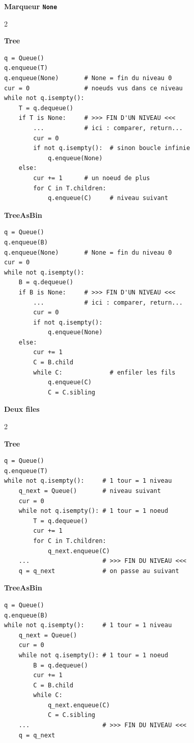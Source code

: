 \documentclass[10pt,a4paper]{article}
\newcommand{\code}[1]{\texttt{#1}}
\newcommand{\TREE}{\colorbox{treec}{\color{white}\strut\small\bfseries\ttfamily Tree}}
\newcommand{\TAB}{\colorbox{tabc}{\color{white}\strut\small\bfseries\ttfamily TreeAsBin}}
\begin{document}
\textbf{\large Marqueur \code{None}}
\begin{multicols}{2}
\TREE
\begin{lstlisting}[style=tree]
q = Queue()
q.enqueue(T)
q.enqueue(None)       # None = fin du niveau 0
cur = 0               # noeuds vus dans ce niveau
while not q.isempty():
    T = q.dequeue()
    if T is None:     # >>> FIN D'UN NIVEAU <<<
        ...           # ici : comparer, return...
        cur = 0
        if not q.isempty():  # sinon boucle infinie
            q.enqueue(None)
    else:
        cur += 1      # un noeud de plus
        for C in T.children:
            q.enqueue(C)     # niveau suivant
\end{lstlisting}
\columnbreak
\TAB
\begin{lstlisting}[style=tab]
q = Queue()
q.enqueue(B)
q.enqueue(None)       # None = fin du niveau 0
cur = 0
while not q.isempty():
    B = q.dequeue()
    if B is None:     # >>> FIN D'UN NIVEAU <<<
        ...           # ici : comparer, return...
        cur = 0
        if not q.isempty():
            q.enqueue(None)
    else:
        cur += 1
        C = B.child
        while C:             # enfiler les fils
            q.enqueue(C)
            C = C.sibling
\end{lstlisting}
\end{multicols}

\textbf{\large Deux files}
\begin{multicols}{2}
\TREE
\begin{lstlisting}[style=tree]
q = Queue()
q.enqueue(T)
while not q.isempty():     # 1 tour = 1 niveau
    q_next = Queue()       # niveau suivant
    cur = 0
    while not q.isempty(): # 1 tour = 1 noeud
        T = q.dequeue()
        cur += 1
        for C in T.children:
            q_next.enqueue(C)
    ...                    # >>> FIN DU NIVEAU <<<
    q = q_next             # on passe au suivant
\end{lstlisting}
\columnbreak
\TAB
\begin{lstlisting}[style=tab]
q = Queue()
q.enqueue(B)
while not q.isempty():     # 1 tour = 1 niveau
    q_next = Queue()
    cur = 0
    while not q.isempty(): # 1 tour = 1 noeud
        B = q.dequeue()
        cur += 1
        C = B.child
        while C:
            q_next.enqueue(C)
            C = C.sibling
    ...                    # >>> FIN DU NIVEAU <<<
    q = q_next
\end{lstlisting}
\end{multicols}
\end{document}
